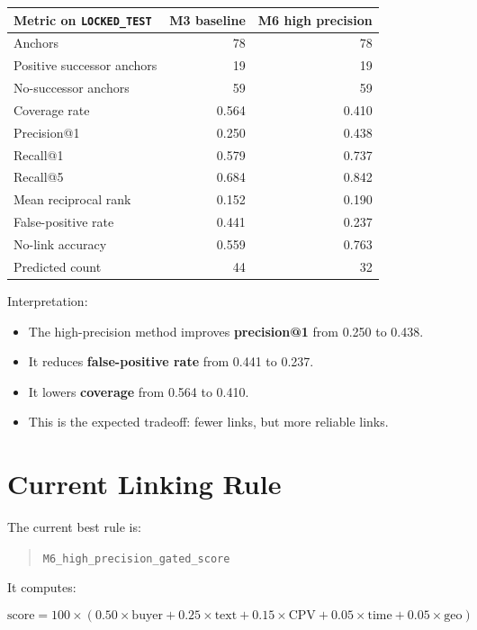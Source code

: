 \documentclass[11pt,a4paper]{article}
\newcommand{\code}[1]{\texttt{#1}}
\newcommand{\metric}[1]{\textbf{#1}}
\begin{document}
\begin{center}
\small
\begin{tabularx}{\textwidth}{Xrr}
\toprule
Metric on \code{LOCKED\_TEST} & M3 baseline & M6 high precision \\
\midrule
Anchors & 78 & 78 \\
Positive successor anchors & 19 & 19 \\
No-successor anchors & 59 & 59 \\
Coverage rate & 0.564 & 0.410 \\
Precision@1 & 0.250 & 0.438 \\
Recall@1 & 0.579 & 0.737 \\
Recall@5 & 0.684 & 0.842 \\
Mean reciprocal rank & 0.152 & 0.190 \\
False-positive rate & 0.441 & 0.237 \\
No-link accuracy & 0.559 & 0.763 \\
Predicted count & 44 & 32 \\
\bottomrule
\end{tabularx}
\end{center}

Interpretation:

\begin{itemize}
  \item The high-precision method improves \metric{precision@1} from 0.250 to 0.438.
  \item It reduces \metric{false-positive rate} from 0.441 to 0.237.
  \item It lowers \metric{coverage} from 0.564 to 0.410.
  \item This is the expected tradeoff: fewer links, but more reliable links.
\end{itemize}

\section*{Current Linking Rule}

The current best rule is:

\begin{quote}
\code{M6\_high\_precision\_gated\_score}
\end{quote}

It computes:

\[
\text{score} =
100 \times (
0.50 \times \text{buyer}
+ 0.25 \times \text{text}
+ 0.15 \times \text{CPV}
+ 0.05 \times \text{time}
+ 0.05 \times \text{geo}
)
\]
\end{document}
